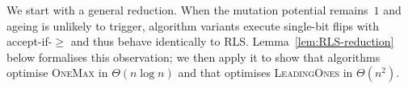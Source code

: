 %
%
%
%
%
%
%
%
%


We start with a general reduction.  When the mutation potential remains~$1$
and ageing is unlikely to trigger,  algorithm variants execute
single-bit flips with accept-if-$\geq$ and thus behave identically to RLS.
Lemma~\ref{lem:RLS-reduction} below formalises this observation;
we then apply it to show that  algorithms optimise
\textsc{OneMax} in $\Theta(n\log n)$ and that \lastBest{} optimises
\textsc{LeadingOnes} in $\Theta(n^2)$.


